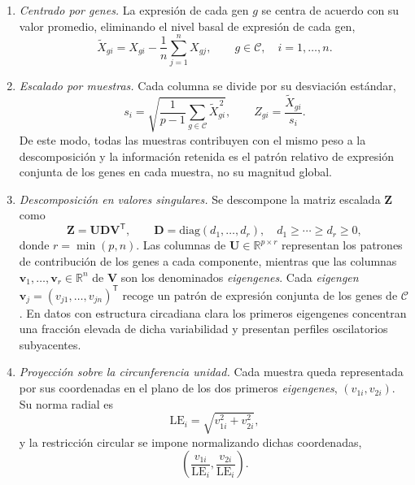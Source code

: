 \documentclass[12pt, a4paper]{report}
\begin{document}
\begin{enumerate}

\item \textit{Centrado por genes.} La expresión de cada gen \(g\) se centra de acuerdo con su valor promedio, eliminando el nivel basal de expresión de cada gen,
\[
\widetilde{X}_{gi}=X_{gi}-\frac{1}{n}\sum_{j=1}^{n}X_{gj},
\qquad g\in\mathcal{C},\quad i=1,\ldots,n .
\]

\item \textit{Escalado por muestras.} Cada columna se divide por su desviación estándar,
\[
s_i=\sqrt{\frac{1}{p-1}\sum_{g\in\mathcal{C}}\widetilde{X}_{gi}^{\,2}},
\qquad
Z_{gi}=\frac{\widetilde{X}_{gi}}{s_i} .
\]
De este modo, todas las muestras contribuyen con el mismo peso a la descomposición y la información retenida es el patrón relativo de expresión conjunta de los genes en cada muestra, no su magnitud global.

\item \textit{Descomposición en valores singulares.} Se descompone la matriz escalada \(\mathbf{Z}\) como
\[
\mathbf{Z}=\mathbf{U}\mathbf{D}\mathbf{V}^{\mathsf{T}},
\qquad
\mathbf{D}=\mathrm{diag}(d_1,\ldots,d_r),
\quad d_1\geq\cdots\geq d_r\geq0 ,
\]
donde \(r=\min(p,n)\). Las columnas de \(\mathbf{U}\in\mathbb{R}^{p\times r}\) representan los patrones de contribución de los genes a cada componente, mientras que las columnas \(\mathbf{v}_1,\ldots,\mathbf{v}_r\in\mathbb{R}^{n}\) de \(\mathbf{V}\) son los denominados \emph{eigengenes}. Cada \emph{eigengen} \(\mathbf{v}_j=(v_{j1},\ldots,v_{jn})^{\mathsf{T}}\) recoge un patrón de expresión conjunta de los genes de \(\mathcal{C}\). En datos con estructura circadiana clara los primeros eigengenes concentran una fracción elevada de dicha variabilidad y presentan perfiles oscilatorios subyacentes.

\item \textit{Proyección sobre la circunferencia unidad.} Cada muestra queda representada por sus coordenadas en el plano de los dos primeros \emph{eigengenes}, \((v_{1i},v_{2i})\). Su norma radial es
\[
\mathrm{LE}_i=\sqrt{v_{1i}^{2}+v_{2i}^{2}},
\]
y la restricción circular se impone normalizando dichas coordenadas,
\[
\left(\frac{v_{1i}}{\mathrm{LE}_i},\frac{v_{2i}}{\mathrm{LE}_i}\right).
\]


\end{enumerate}
\end{document}
